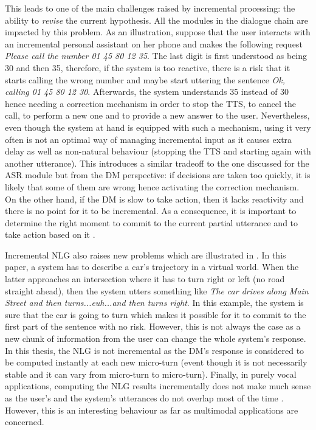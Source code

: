 This leads to one of the main challenges raised by incremental processing: the ability to \textit{revise} the current hypothesis. All the modules in the dialogue chain are impacted by this problem. As an illustration, suppose that the user interacts with an incremental personal assistant on her phone and makes the following request \textit{Please call the number 01 45 80 12 35}. The last digit is first understood as being 30 and then 35, therefore, if the system is too reactive, there is a risk that it starts calling the wrong number and maybe start uttering the sentence \textit{Ok, calling 01 45 80 12 30}. Afterwards, the system understands 35 instead of 30 hence needing a correction mechanism in order to stop the TTS, to cancel the call, to perform a new one and to provide a new answer to the user. Nevertheless, even though the system at hand is equipped with such a mechanism, using it very often is not an optimal way of managing incremental input as it causes extra delay as well as non-natural behaviour (stopping the TTS and starting again with another utterance). This introduces a similar tradeoff to the one discussed for the ASR module but from the DM perspective: if decisions are taken too quickly, it is likely that some of them are wrong hence activating the correction mechanism. On the other hand, if the DM is slow to take action, then it lacks reactivity and there is no point for it to be incremental. As a consequence, it is important to determine the right moment to commit to the current partial utterance and to take action based on it \cite{Raux2008,Lu2011}.

		Incremental NLG also raises new problems which are illustrated in \cite{Baumann2013}. In this paper, a system has to describe a car's trajectory in a virtual world. When the latter approaches an intersection where it has to turn right or left (no road straight ahead), then the system utters something like \textit{The car drives along Main Street and then turns...euh...and then turns right}. In this example, the system is sure that the car is going to turn which makes it possible for it to commit to the first part of the sentence with no risk. However, this is not always the case as a new chunk of information from the user can change the whole system's response. In this thesis, the NLG is not incremental as the DM's response is considered to be computed instantly at each new micro-turn (event though it is not necessarily stable and it can vary from micro-turn to micro-turn). Finally, in purely vocal applications, computing the NLG results incrementally does not make much sense as the user's and the system's utterances do not overlap most of the time \cite{Sacks1974}. However, this is an interesting behaviour as far as multimodal applications are concerned.

